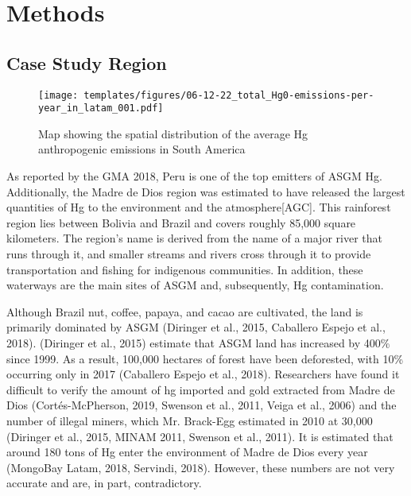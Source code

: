 \section{Methods}

\subsection{Case Study Region}
\begin{figure}[H]
  \texttt{[image: templates/figures/06-12-22\_total\_Hg0-emissions-per-year\_in\_latam\_001.pdf]}
  \centering
  \caption{Map showing the spatial distribution of the average Hg anthropogenic emissions in South America}
  \label{fig:Latam_Hg_em}
\end{figure}
\FloatBarrier
\begin{flushleft}
As reported by the GMA 2018, Peru is one of the top emitters of ASGM Hg. Additionally, the Madre de Dios region was estimated to have released the largest quantities of Hg to the environment and the atmosphere[AGC]. This rainforest region lies between Bolivia and Brazil and covers roughly 85,000 square kilometers. The region's name is derived from the name of a major river that runs through it, and smaller streams and rivers cross through it to provide transportation and fishing for indigenous communities. In addition, these waterways are the main sites of ASGM and, subsequently, Hg contamination. 
\end{flushleft}

\begin{flushleft}
Although Brazil nut, coffee, papaya, and cacao are cultivated, the land is primarily dominated by ASGM (Diringer et al., 2015, Caballero Espejo et al., 2018). (Diringer et al., 2015) estimate that ASGM land has increased by 400\% since 1999. As a result, 100,000 hectares of forest have been deforested, with 10\% occurring only in 2017 (Caballero Espejo et al., 2018). Researchers have found it difficult to verify the amount of hg imported and gold extracted from Madre de Dios (Cortés-McPherson, 2019, Swenson et al., 2011, Veiga et al., 2006) and the number of illegal miners, which Mr. Brack-Egg estimated in 2010 at 30,000 (Diringer et al., 2015, MINAM 2011, Swenson et al., 2011). It is estimated that around 180 tons of Hg enter the environment of Madre de Dios every year (MongoBay Latam, 2018, Servindi, 2018). However, these numbers are not very accurate and are, in part, contradictory. 
\end{flushleft}


